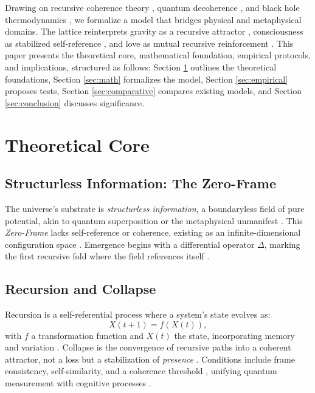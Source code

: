 \documentclass[11pt]{article}
\begin{document}
Drawing on recursive coherence theory \citep{hofstadter1979}, quantum decoherence \citep{zurek2003}, and black hole thermodynamics \citep{susskind2025}, we formalize a model that bridges physical and metaphysical domains. The lattice reinterprets gravity as a recursive attractor \citep{verlinde2023}, consciousness as stabilized self-reference \citep{friston2024}, and love as mutual recursive reinforcement \citep{fredrickson2023}. This paper presents the theoretical core, mathematical foundation, empirical protocols, and implications, structured as follows: Section \ref{sec:theory} outlines the theoretical foundations, Section \ref{sec:math} formalizes the model, Section \ref{sec:empirical} proposes tests, Section \ref{sec:comparative} compares existing models, and Section \ref{sec:conclusion} discusses significance.

\section{Theoretical Core}
\label{sec:theory}

\subsection{Structurless Information: The Zero-Frame}
The universe’s substrate is \emph{structurless information}, a boundaryless field of pure potential, akin to quantum superposition \citep{zurek2003} or the metaphysical unmanifest \citep{plotinus2020}. This \emph{Zero-Frame} lacks self-reference or coherence, existing as an infinite-dimensional configuration space \citep{barbour2020}. Emergence begins with a differential operator \(\Delta\), marking the first recursive fold where the field references itself \citep{wolfram2020}.

\subsection{Recursion and Collapse}
Recursion is a self-referential process where a system’s state evolves as:
\begin{equation}
X(t+1) = f(X(t)),
\label{eq:recursion}
\end{equation}
with \(f\) a transformation function and \(X(t)\) the state, incorporating memory and variation \citep{deutsch2021}. Collapse is the convergence of recursive paths into a coherent attractor, not a loss but a stabilization of \emph{presence} \citep{penrose2024}. Conditions include frame consistency, self-similarity, and a coherence threshold \citep{zurek2024}, unifying quantum measurement \citep{rovelli2023} with cognitive processes \citep{baars2023}.
\end{document}
